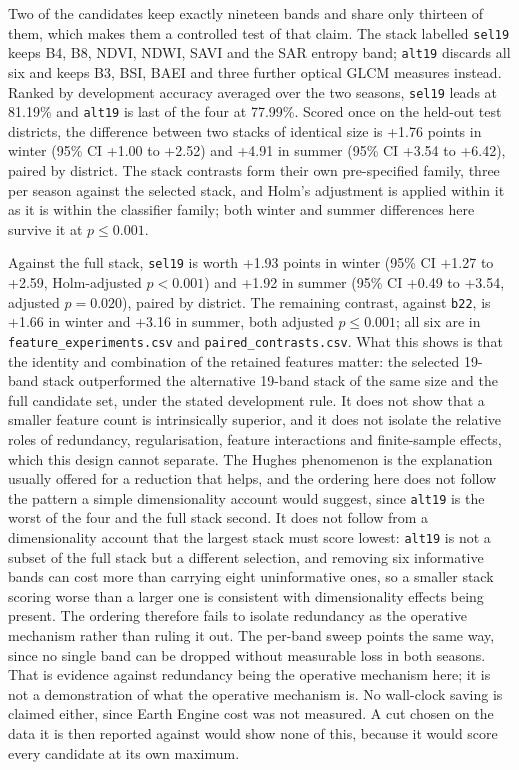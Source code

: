 \documentclass[conference]{IEEEtran}
\begin{document}
Two of the candidates keep exactly nineteen bands and share only thirteen of them, which makes them a controlled test of that claim. The stack labelled \texttt{sel19} keeps B4, B8, NDVI, NDWI, SAVI and the SAR entropy band; \texttt{alt19} discards all six and keeps B3, BSI, BAEI and three further optical GLCM measures instead. Ranked by development accuracy averaged over the two seasons, \texttt{sel19} leads at 81.19\% and \texttt{alt19} is last of the four at 77.99\%. Scored once on the held-out test districts, the difference between two stacks of identical size is +1.76 points in winter (95\% CI +1.00 to +2.52) and +4.91 in summer (95\% CI +3.54 to +6.42), paired by district. The stack contrasts form their own pre-specified family, three per season against the selected stack, and Holm's adjustment is applied within it as it is within the classifier family; both winter and summer differences here survive it at $p\le 0.001$.

Against the full stack, \texttt{sel19} is worth +1.93 points in winter (95\% CI +1.27 to +2.59, Holm-adjusted $p<0.001$) and +1.92 in summer (95\% CI +0.49 to +3.54, adjusted $p=0.020$), paired by district. The remaining contrast, against \texttt{b22}, is +1.66 in winter and +3.16 in summer, both adjusted $p\le0.001$; all six are in \texttt{feature\_experiments.csv} and \texttt{paired\_contrasts.csv}. What this shows is that the identity and combination of the retained features matter: the selected 19-band stack outperformed the alternative 19-band stack of the same size and the full candidate set, under the stated development rule. It does not show that a smaller feature count is intrinsically superior, and it does not isolate the relative roles of redundancy, regularisation, feature interactions and finite-sample effects, which this design cannot separate. The Hughes phenomenon \cite{r32} is the explanation usually offered for a reduction that helps, and the ordering here does not follow the pattern a simple dimensionality account would suggest, since \texttt{alt19} is the worst of the four and the full stack second. It does not follow from a dimensionality account that the largest stack must score lowest: \texttt{alt19} is not a subset of the full stack but a different selection, and removing six informative bands can cost more than carrying eight uninformative ones, so a smaller stack scoring worse than a larger one is consistent with dimensionality effects being present. The ordering therefore fails to isolate redundancy as the operative mechanism rather than ruling it out. The per-band sweep points the same way, since no single band can be dropped without measurable loss in both seasons. That is evidence against redundancy being the operative mechanism here; it is not a demonstration of what the operative mechanism is. No wall-clock saving is claimed either, since Earth Engine cost was not measured. A cut chosen on the data it is then reported against would show none of this, because it would score every candidate at its own maximum.
\end{document}
